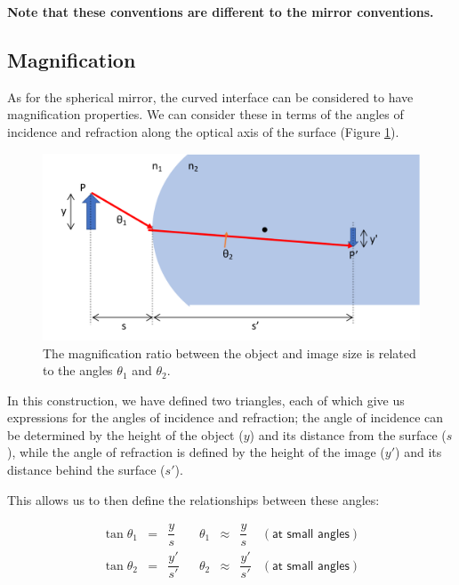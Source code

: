 \documentclass[
]{book}
\begin{document}
\textbf{Note that these conventions are different to the mirror conventions.}

\hypertarget{sec:ch16-magnificationcurvedsurface1}{%
\subsection{Magnification}\label{sec:ch16-magnificationcurvedsurface1}}

As for the spherical mirror, the curved interface can be considered to have magnification properties. We can consider these in terms of the angles of incidence and refraction along the optical axis of the surface (Figure \ref{fig:ch16-sphericalsurfacemag1}).

\begin{figure}

{\centering \includegraphics[width=0.7\linewidth]{visualisations/LaTeX/ch16-sphericalsurfacemag1} 

}

\caption{The magnification ratio between the object and image size is related to the angles $\theta_1$ and $\theta_2$.}\label{fig:ch16-sphericalsurfacemag1}
\end{figure}

In this construction, we have defined two triangles, each of which give us expressions for the angles of incidence and refraction; the angle of incidence can be determined by the height of the object (\(y\)) and its distance from the surface (\(s\)), while the angle of refraction is defined by the height of the image (\(y'\)) and its distance behind the surface (\(s'\)).

This allows us to then define the relationships between these angles:

\begin{equation}
\begin{array}{rclcrcll}
\tan \theta_1 &=& \dfrac{y}{s} & & \theta_1 &\approx& \dfrac{y}{s} & (\textsf{at small angles}) \\
\tan \theta_2 &=& \dfrac{y'}{s'} & & \theta_2 &\approx& \dfrac{y'}{s'} & (\textsf{at small angles}) \\
\end{array}
\label{eq:ch16-sphericalsurfacemag1}
\end{equation}
\end{document}
